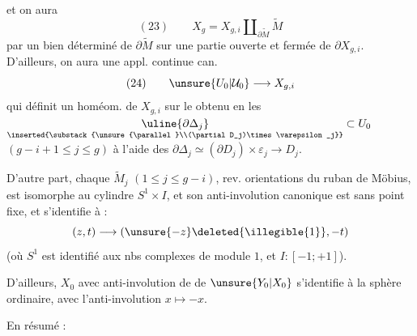
et on aura
\[
(23)\qquad X_g=X_{g,i}\amalg_{\partial\widetilde M}\widetilde M
\]
par un  bien déterminé de $\partial\widetilde M$ sur une partie ouverte et fermée de $\partial X_{g,i}$. D'ailleurs, on aura une appl. continue can.
\[
(24)\qquad \unsure{U_0|\mathcal U_0}\longrightarrow X_{g,i}
\]
qui définit un homéom. de $X_{g,i}$ sur le   obtenu en  les $\underset{\inserted{\substack{\unsure{\parallel}\\(\partial D_j)\times\varepsilon_j}}}{\uline{\partial\Delta_j}}\subset U_0$ $(g-i+1\leq j\leq g)$ à l'aide des  $\partial\Delta_j\simeq(\partial D_j)\times\varepsilon_j\longrightarrow D_j$.

D'autre part, chaque $\widetilde M_j$ $(1\leq j\leq g-i)$, rev.  orientations du ruban de Möbius, est isomorphe au cylindre $S^1\times I$, et son anti-involution canonique  est sans point fixe, et s'identifie à :
\[
(z,t)\longrightarrow(\unsure{-z}\deleted{\illegible{1}},-t)
\]
(où $S^1$ est identifié aux nbs complexes de module $1$, et $I:[-1;+1]$).

D'ailleurs, $X_0$  avec  anti-involution de  de $\unsure{Y_0|X_0}$ s'identifie à la sphère  ordinaire, avec l'anti-involution $x\longmapsto-x$.


En résumé :

